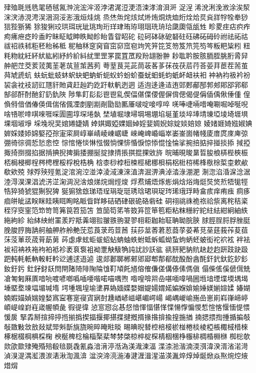 肂殈毦毤毨毣毢毧氥浺浣浤浶洍浡涒浘浢浭浯涑涍淯浿涆
浞浧浠涗浰浼浟涂涘洯浨涋浾涀涄洖涃浻浽浵涐烜烓烑
烝烋缹烢烗烒烞烠烔烍烅烆烇烚烎烡牂牸牷牶猀狺狴狾狶
狳狻猁珓珙珥珖玼珧珣珩珜珒珛珔珝珚珗珘珨瓞瓟瓴瓵甡
畛畟疰痁疻痄痀疿疶疺皊盉眝眛眐眓眒眣眑眕眙眚眢眧砣
砬砢砵砯砨砮砫砡砩砳砪砱祔祛祏祜祓祒祑秫秬秠秮秭秪
秜秞秝窆窉窅窋窌窊窇竘笐笄笓笅笏笈笊笎笉笒粄粑粊粌
粈粍粅紞紝紑紎紘紖紓紟紒紏紌罜罡罞罠罝罛羖羒翃翂翀
耖耾耹胺胲胹胵脁胻脀舁舯舥茳茭荄茙荑茥荖茿荁茦茜茢
荂荎茛茪茈茼荍茖茤茠茷茯茩荇荅荌荓茞茬荋茧荈虓虒蚢
蚨蚖蚍蚑蚞蚇蚗蚆蚋蚚蚅蚥蚙蚡蚧蚕蚘蚎蚝蚐蚔衃衄衭衵
衶衲袀衱衿衯袃衾衴衼訒豇豗豻貤貣赶赸趵趷趶軑軓迾迵
适迿迻逄迼迶郖郠郙郚郣郟郥郘郛郗郜郤酐酎酏釕釢釚陜
陟隼飣⾽髟⾿鬯乿偰偪偡偞偠偓偋偝偲偈偍偁偛偊偢倕偅
偟偩偫偣偤偆偀偮偳偗偑凐剫剭剬剮勖勓匭厜啵啶唼啍啐
唴唪啑啢唶唵唰啒啅唌唲啥啎唹啈唭唻啀啋圊圇埻堔埢埶
埜埴堀埭埽堈埸堋埳埏堇埮埣埲埥埬埡堎埼堐埧堁堌埱埩
埰堍堄奜婠婘婕婧婞娸娵婭婐婟婥婬婓婤婗婃婝婒婄婛
婈媎娾婍娹婌婰婩婇婑婖婂婜孲孮寁寀屙崞崋崝崚崠崌崨
崍崦崥崏崰崒崣崟崮帾帴庱庴庹庲庳弶弸徛徖徟悊悐悆悾
悰悺惓惔惏惤惙惝惈悱惛悷惊悿惃惍惀挲捥掊掂捽掽掞掭
掝掗掫掎捯掇掐据掯捵掜捭掮捼掤挻掟捸掅掁掑掍捰敓旍
晥晡晛晙晜晢朘桹梇梐梜桭桮梮梫楖桯梣梬梩桵桴梲梏桷
梒桼桫桲梪梀桱桾梛梖梋梠梉梤桸桻梑梌梊桽欶欳欷欸殑
殏殍殎殌氪淀涫涴涳湴涬淩淢涷淶淔渀淈淠淟淖涾淥淜淝
淛淴淊涽淭淰涺淕淂淏淉淐淲淓淽淗淍淣涻烺焍烷焗烴焌
烰焄烳焐烼烿焆焓焀烸烶焋焂焎牾牻牼牿猝猗猇猑猘猊猈
狿猏猞玈珶珸珵琄琁珽琇琀珺珼珿琌琋珴琈畤畣痎痒痏痋
痌痑痐皏皉盓眹眯眭眱眲眴眳眽眥眻眵硈硒硉硍硊硌砦硅
硐祤祧祩祪祣祫祡离秺秸秶秷窏窔窐笵笻笴笥笰笢笤笳笘
笪笝笱笫笭笯笲笸笚笣粔粘粖粣紵紽紸紶紺絅紬紩絁絇紾
紿絊紻紨罣羕羜羝羛翊翋翍翐翑翇翏翉耟耞耛聇聃聈脘脥
脙脛脭脟脬脞脡脕脧脝脢舑舸舳舺舴舲艴莐莣莨莍荺荳莤
荴莏莁莕莙荵莔莩荽莃莌莝莛莪莋荾莥莯莈莗莰荿莦莇莮
荶虙虖蚿蚷蛂蛁蛅蚺蚰蛈蚹蚳蚸蛌蚴蚻蚼蛃蚽蚾衒袉袕袨
袢袪袚袑袡袟袘袧袙袛袗袤袬袌袓袎覂觖觙觕訰訧訬訞谹
谻豜豝豽貥赽赻赹趼跂趹趿跁軘軞軝軜軗軠軡逤逋逑逜逌
逡郯郪郰郴郲郳郔郫郬郩酖酘酚酓酕釬釴釱釳釸釤釹釪釫
釷釨釮镺閆閈陼陭陫陱陯隿靪頄飥馗傛傕傔傞傋傣傃傌傎
傝偨傜傒傂傇兟凔匒匑厤厧喑喨喥喭啷噅喢喓喈喏喵喁喣
喒喤啽喌喦啿喕喡喎圌堩堷堙堞堧堣堨埵塈堥堜堛堳堿堶
堮堹堸堭堬堻奡媯媔媟婺媢媞婸媦婼媥媬媕媮娷媄媊媗媃
媋媩婻婽媌媜媏媓媝寪寍寋寔寑寊寎尌尰崷嵃嵫嵁嵋崿崵
嵑嵎嵕崳崺嵒崽崱嵙嵂崹嵉崸崼崲崶嵀嵅幄幁彘徦徥徫
惉悹惌惢惎惄愔惲愊愖愅惵愓惸惼惾惁愃愘愝愐惿愄愋扊
掔掱掰揎揥揨揯揃撝揳揊揠揶揕揲揵摡揟掾揝揜揄揘揓揂
揇揌揋揈揰揗揙攲敧敪敤敜敨敥斌斝斞斮旐旒晼晬晻暀晱
晹晪晲朁椌棓椄棜椪棬棪棱椏棖棷棫棤棶椓椐棳棡椇棌椈
楰梴椑棯棆椔棸棐棽棼棨椋椊椗棎棈棝棞棦棴棑椆棔棩椕
椥棇欹欻欿欼殔殗殙殕殽毰毲毳氰淼湆湇渟湉溈渼渽湅湢
渫渿湁湝湳渜渳湋湀湑渻渃渮湞湨湜湡渱渨湠湱湫渹渢渰
湓湥渧湸湤湷湕湹湒湦渵渶湚焠焞焯烻焮焱焣焥焢焲焟焨
